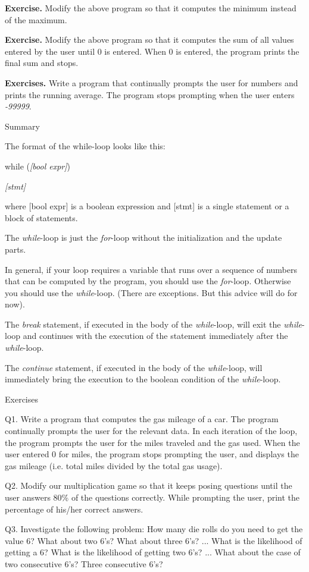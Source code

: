 \documentclass[
]{article}
\begin{document}
\textbf{Exercise.} Modify the above program so that it computes the
minimum instead of the maximum.

\textbf{Exercise.} Modify the above program so that it computes the sum
of all values entered by the user until 0 is entered. When 0 is entered,
the program prints the final sum and stops.

\textbf{Exercises.} Write a program that continually prompts the user
for numbers and prints the running average. The program stops prompting
when the user enters \emph{-99999}.

Summary

The format of the while-loop looks like this:

while (\emph{{[}bool expr{]}})

\emph{{[}stmt{]}}

where {[}bool expr{]} is a boolean expression and {[}stmt{]} is a single
statement or a block of statements.

The \emph{while}-loop is just the \emph{for}-loop without the
initialization and the update parts.

In general, if your loop requires a variable that runs over a sequence
of numbers that can be computed by the program, you should use the
\emph{for}-loop. Otherwise you should use the \emph{while}-loop. (There
are exceptions. But this advice will do for now).

The \emph{break} statement, if executed in the body of the
\emph{while}-loop, will exit the \emph{while}-loop and continues with
the execution of the statement immediately after the \emph{while}-loop.

The \emph{continue} statement, if executed in the body of the
\emph{while}-loop, will immediately bring the execution to the boolean
condition of the \emph{while}-loop.

Exercises

\hfill\break

Q1. Write a program that computes the gas mileage of a car. The program
continually prompts the user for the relevant data. In each iteration of
the loop, the program prompts the user for the miles traveled and the
gas used. When the user entered 0 for miles, the program stops prompting
the user, and displays the gas mileage (i.e. total miles divided by the
total gas usage).

Q2. Modify our multiplication game so that it keeps posing questions
until the user answers 80\% of the questions correctly. While prompting
the user, print the percentage of his/her correct answers.

Q3. Investigate the following problem: How many die rolls do you need to
get the value 6? What about two 6's? What about three 6's? ... What is
the likelihood of getting a 6? What is the likelihood of getting two
6's? ... What about the case of two consecutive 6's? Three consecutive
6's?
\end{document}
